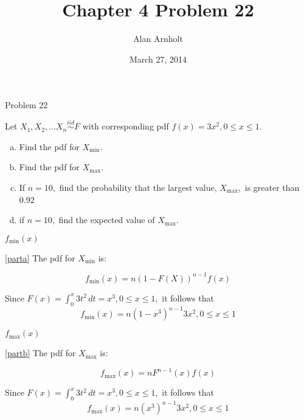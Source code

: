 \documentclass[ignorenonframetext,]{beamer}
\title{Chapter 4 Problem 22}
\author{Alan Arnholt}
\date{March 27, 2014}
\begin{document}
\frame{\titlepage}

\begin{frame}{Problem 22}

Let $X_1, X_2, \ldots X_n \overset{iid}\sim F$ with corresponding pdf
$f(x) = 3x^2, 0\leq x \leq 1.$

\begin{enumerate}[(a)]
\item Find the pdf for $X_{\textrm{min}}.$ \label{parta}
\item Find the pdf for $X_{\textrm{max}}.$ \label{partb}
\item If $n = 10,$ find the probability that the largest value, $X_{\textrm{max}},$ is greater than 0.92 \label{partc}
\item if $n = 10,$ find the expected value of $X_{\textrm{max}}.$ \label{partd}
\end{enumerate}

\end{frame}

\begin{frame}{$f_{\textrm{min}}(x)$}

\eqref{parta} The pdf for $X_{\textrm{min}}$ is:

\begin{equation}\label{Xmin}
f_{\textrm{min}}(x) = n\left(1 - F(X)\right)^{n-1}f(x)
\end{equation}

Since $F(x) = \int_{0}^{x}3t^2\,dt = x^3, 0\leq x \leq 1,$ it follows
that
\[f_{\textrm{min}}(x) = n\left(1 - x^3\right)^{n-1}3x^2,  0\leq x \leq 1\]

\end{frame}

\begin{frame}{$f_{\textrm{max}}(x)$}

\eqref{partb} The pdf for $X_{\textrm{max}}$ is:

\begin{equation}\label{Xmax}
f_{\textrm{max}}(x) = nF^{n-1}(x)f(x)
\end{equation}

Since $F(x) = \int_{0}^{x}3t^2\,dt = x^3, 0\leq x \leq 1,$ it follows
that
\[f_{\textrm{max}}(x) = n\left(x^3\right)^{n-1}3x^2,  0\leq x \leq 1\]

\end{frame}
\end{document}
